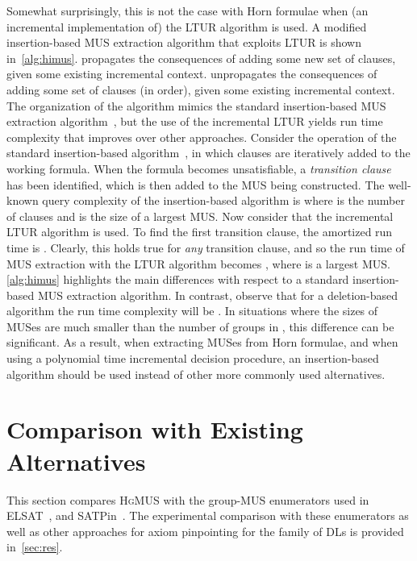 \documentclass{llncs}
\newcommand{\elplain}{\xspace}
\newcommand{\hgmus}{\textsc{HgMUS}\xspace}
\newcommand{\elsat}{ELSAT\xspace}
\begin{document}
Somewhat surprisingly, this is not the case with Horn formulae when
(an incremental implementation of) the LTUR algorithm is used.
A modified insertion-based MUS extraction algorithm that exploits LTUR
is shown in~\autoref{alg:himus}.
\prop propagates the consequences of adding some new set of clauses,
given some existing incremental context.
\undo unpropagates the consequences of adding some set of clauses (in
order), given some existing incremental context.
The organization of the algorithm mimics the standard insertion-based
MUS extraction algorithm~\cite{puget-ecai88}, but the use of the
incremental LTUR yields run time complexity that improves over other
approaches.
Consider the operation of the standard insertion-based
algorithm~\cite{puget-ecai88}, in which clauses are iteratively added
to the working formula. When the formula becomes unsatisfiable, a
{\em transition clause}~\cite{blms-aicomm12} has been identified,
which is then added to the MUS being constructed.
The well-known query complexity of the insertion-based algorithm is
 where  is the number of clauses and  is the
size of a largest MUS.
Now consider that the incremental LTUR algorithm is used. To find the
first transition clause, the amortized run time is
. Clearly, this holds true for {\em any}
transition clause, and so the run time of MUS extraction with the LTUR
algorithm becomes , where
 is a largest MUS.
\autoref{alg:himus} highlights the main differences with respect to a
standard insertion-based MUS extraction algorithm.
In contrast, observe that for a deletion-based algorithm the run time
complexity will be . In
situations where the sizes of MUSes are much smaller than the number
of groups in , this difference can be significant. As a
result, when extracting MUSes from Horn formulae, and when using a
polynomial time incremental decision procedure, an insertion-based
algorithm should be used instead of other more commonly used
alternatives.


\section{Comparison with Existing Alternatives} \label{sec:relw}

This section compares \hgmus with the group-MUS enumerators used in
\elsat~\cite{sebastiani-cade09,sebastiani-tr15},
and SATPin~\cite{mp-tr15}.
The experimental comparison with these enumerators as well as other
approaches for axiom pinpointing for the \elplain family of DLs is
provided in~\autoref{sec:res}.
\end{document}
